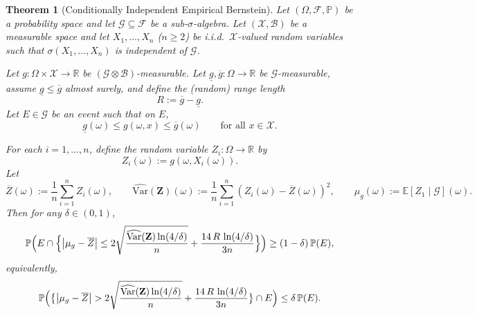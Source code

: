 \documentclass[twoside]{article}
\newtheorem{theorem}{Theorem}
\begin{document}
\begin{theorem}[Conditionally Independent Empirical Bernstein]
\label{thm:cond_empirical_bernstein_final}
Let $(\Omega,\mathcal{F},\mathbb{P})$ be a probability space and let $\mathcal{G}\subseteq\mathcal{F}$ be a sub-$\sigma$-algebra.
Let $(\mathcal{X},\mathcal{B})$ be a measurable space and let $X_1,\dots,X_n$ ($n\ge 2$) be i.i.d.\ $\mathcal{X}$-valued random variables such that $\sigma(X_1,\dots,X_n)$ is independent of $\mathcal{G}$.

Let $g:\Omega\times\mathcal{X}\to\mathbb{R}$ be $(\mathcal{G}\otimes\mathcal{B})$-measurable.
Let $\underline{g},\overline{g}:\Omega\to\mathbb{R}$ be $\mathcal{G}$-measurable, assume $\underline{g}\le \overline{g}$ almost surely, and define the (random) range length
\[
R:=\overline{g}-\underline{g}.
\]
Let $E\in\mathcal{G}$ be an event such that on $E$,
\[
\underline{g}(\omega)\le g(\omega,x)\le \overline{g}(\omega)
\qquad
\text{for all }x\in\mathcal{X}.
\]

For each $i=1,\dots,n$, define the random variable $Z_i:\Omega\to\mathbb{R}$ by
\[
Z_i(\omega):=g(\omega,X_i(\omega)).
\]
Let
\[
\overline{Z}(\omega):=\frac{1}{n}\sum_{i=1}^n Z_i(\omega),
\qquad
\widehat{\mathrm{Var}}(\mathbf Z)(\omega)
:=\frac{1}{n}\sum_{i=1}^n (Z_i(\omega)-\overline{Z}(\omega))^2,
\qquad
\mu_g(\omega):=\mathbb E[Z_1\mid \mathcal{G}](\omega).
\]
Then for any $\delta\in(0,1)$,
\[
\mathbb{P}\Bigl(
E\cap\Bigl\{
\bigl|\mu_g-\overline{Z}\bigr|
\le
2\sqrt{\frac{\widehat{\mathrm{Var}}(\mathbf Z)\ln(4/\delta)}{n}}
+
\frac{14\,R\,\ln(4/\delta)}{3n}
\Bigr\}
\Bigr)
\ge
(1-\delta)\,\mathbb{P}(E),
\]
equivalently,
\[
\mathbb{P}\Bigl(
\bigl\{
\bigl|\mu_g-\overline{Z}\bigr|
>
2\sqrt{\frac{\widehat{\mathrm{Var}}(\mathbf Z)\ln(4/\delta)}{n}}
+
\frac{14\,R\,\ln(4/\delta)}{3n}
\bigr\}\cap E
\Bigr)
\le
\delta\,\mathbb{P}(E).
\]
\end{theorem}
\end{document}
